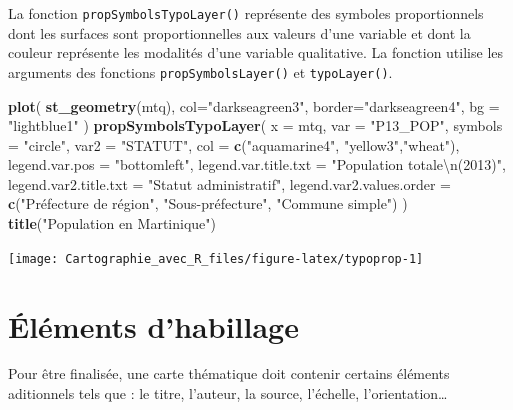 \documentclass[]{book}
\newenvironment{Shaded}{\begin{snugshade}}{\end{snugshade}}
\newcommand{\KeywordTok}[1]{\textcolor[rgb]{0.13,0.29,0.53}{\textbf{#1}}}
\newcommand{\DataTypeTok}[1]{\textcolor[rgb]{0.13,0.29,0.53}{#1}}
\newcommand{\CharTok}[1]{\textcolor[rgb]{0.31,0.60,0.02}{#1}}
\newcommand{\StringTok}[1]{\textcolor[rgb]{0.31,0.60,0.02}{#1}}
\newcommand{\NormalTok}[1]{#1}
\begin{document}
La fonction \texttt{propSymbolsTypoLayer()} représente des symboles
proportionnels dont les surfaces sont proportionnelles aux valeurs d'une
variable et dont la couleur représente les modalités d'une variable
qualitative. La fonction utilise les arguments des fonctions
\texttt{propSymbolsLayer()} et \texttt{typoLayer()}.

\begin{Shaded}
\begin{Highlighting}[]
\KeywordTok{plot}\NormalTok{(}
  \KeywordTok{st_geometry}\NormalTok{(mtq), }
  \DataTypeTok{col=}\StringTok{"darkseagreen3"}\NormalTok{, }
  \DataTypeTok{border=}\StringTok{"darkseagreen4"}\NormalTok{,  }
  \DataTypeTok{bg =} \StringTok{"lightblue1"}
\NormalTok{)}
\KeywordTok{propSymbolsTypoLayer}\NormalTok{(}
  \DataTypeTok{x =}\NormalTok{ mtq, }
  \DataTypeTok{var =} \StringTok{"P13_POP"}\NormalTok{, }
  \DataTypeTok{symbols =} \StringTok{"circle"}\NormalTok{,}
  \DataTypeTok{var2 =} \StringTok{"STATUT"}\NormalTok{,}
  \DataTypeTok{col =} \KeywordTok{c}\NormalTok{(}\StringTok{"aquamarine4"}\NormalTok{, }\StringTok{"yellow3"}\NormalTok{,}\StringTok{"wheat"}\NormalTok{),}
  \DataTypeTok{legend.var.pos =} \StringTok{"bottomleft"}\NormalTok{,}
  \DataTypeTok{legend.var.title.txt =} \StringTok{"Population totale}\CharTok{\textbackslash{}n}\StringTok{(2013)"}\NormalTok{,}
  \DataTypeTok{legend.var2.title.txt =} \StringTok{"Statut administratif"}\NormalTok{,}
  \DataTypeTok{legend.var2.values.order =} \KeywordTok{c}\NormalTok{(}\StringTok{"Préfecture de région"}\NormalTok{,}
                               \StringTok{"Sous-préfecture"}\NormalTok{,}
                               \StringTok{"Commune simple"}\NormalTok{)}
\NormalTok{)}
\KeywordTok{title}\NormalTok{(}\StringTok{"Population en Martinique"}\NormalTok{)}
\end{Highlighting}
\end{Shaded}

\begin{center}\texttt{[image: Cartographie\_avec\_R\_files/figure-latex/typoprop-1]} \end{center}

\section{Éléments d'habillage}\label{elements-dhabillage}

Pour être finalisée, une carte thématique doit contenir certains
éléments aditionnels tels que : le titre, l'auteur, la source,
l'échelle, l'orientation\ldots{}
\end{document}
